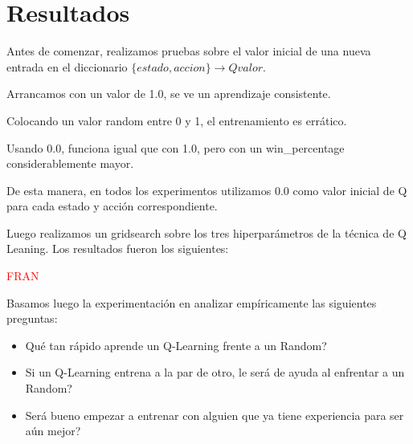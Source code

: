 \section{Resultados}

Antes de comenzar, realizamos pruebas sobre el valor inicial de una nueva entrada en el diccionario $\{estado, accion\} \rightarrow Q valor$.

Arrancamos con un valor de 1.0, se ve un aprendizaje consistente.

Colocando un valor random entre 0 y 1, el entrenamiento es err\'atico.

Usando 0.0, funciona igual que con 1.0, pero con un win\_percentage considerablemente mayor.

De esta manera, en todos los experimentos utilizamos 0.0 como valor inicial de Q para cada estado y acci\'on correspondiente.

Luego realizamos un gridsearch sobre los tres hiperpar\'ametros de la t\'ecnica de Q Leaning. Los resultados fueron los siguientes:

\textcolor{red}{FRAN}

Basamos luego la experimentaci\'on en analizar emp\'iricamente las siguientes preguntas:

\begin{itemize}
  \item Qu\'e tan r\'apido aprende un Q-Learning frente a un Random?
  \item Si un Q-Learning entrena a la par de otro, le ser\'a de ayuda al enfrentar a un Random?
  \item Ser\'a bueno empezar a entrenar con alguien que ya tiene experiencia para ser a\'un mejor?
\end{itemize}


\newpage

\newpage

